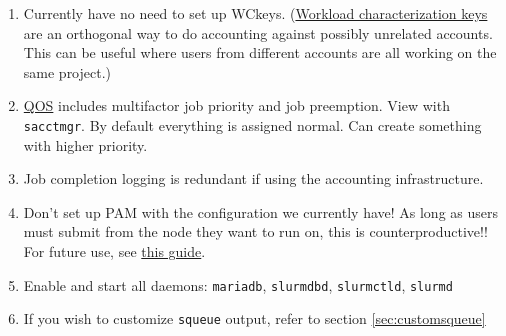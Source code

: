 \begin{enumerate}
\item Currently have no need to set up WCkeys. (\href{https://slurm.schedmd.com/wckey.html}{Workload characterization keys} are an orthogonal way to do accounting against possibly unrelated accounts. This can be useful where users from different accounts are all working on the same project.)

\item \href{https://slurm.schedmd.com/qos.html}{QOS} includes multifactor job priority and job preemption. View with \texttt{sacctmgr}. By default everything is assigned normal. Can create something with higher priority.

\item Job completion logging is redundant if using the accounting infrastructure.

\item Don't set up PAM with the configuration we currently have! As long as users must submit from the node they want to run on, this is counterproductive!! For future use, see \href{https://wiki.fysik.dtu.dk/niflheim/Slurm_configuration#pam-module-restrictions}{this guide}.

\item Enable and start all daemons: \texttt{mariadb}, \texttt{slurmdbd}, \texttt{slurmctld}, \texttt{slurmd}

\item If you wish to customize \texttt{squeue} output, refer to section \ref{sec:customsqueue}

\end{enumerate}

